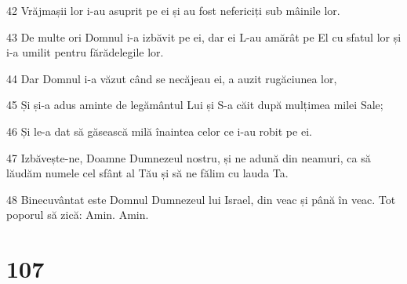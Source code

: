 \par 42 Vrăjmașii lor i-au asuprit pe ei și au fost nefericiți sub mâinile lor.
\par 43 De multe ori Domnul i-a izbăvit pe ei, dar ei L-au amărât pe El cu sfatul lor și i-a umilit pentru fărădelegile lor.
\par 44 Dar Domnul i-a văzut când se necăjeau ei, a auzit rugăciunea lor,
\par 45 Și și-a adus aminte de legământul Lui și S-a căit după mulțimea milei Sale;
\par 46 Și le-a dat să găsească milă înaintea celor ce i-au robit pe ei.
\par 47 Izbăvește-ne, Doamne Dumnezeul nostru, și ne adună din neamuri, ca să lăudăm numele cel sfânt al Tău și să ne fălim cu lauda Ta.
\par 48 Binecuvântat este Domnul Dumnezeul lui Israel, din veac și până în veac. Tot poporul să zică: Amin. Amin.

\chapter{107}

